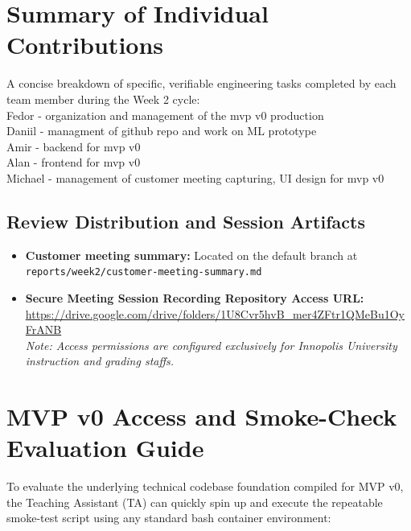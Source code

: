 \documentclass[11pt,a4paper]{article}
\begin{document}
\section{Summary of Individual Contributions}
A concise breakdown of specific, verifiable engineering tasks completed by each team member during the Week 2 cycle:\\
Fedor - organization and management of the mvp v0 production \\
Daniil - managment of github repo and work on ML prototype\\
Amir - backend for mvp v0 \\
Alan - frontend for mvp v0\\
Michael - management of customer meeting capturing, UI design for mvp v0\\
\subsection{Review Distribution and Session Artifacts}
\begin{itemize}[leftmargin=*]
    \item \textbf{Customer meeting summary:} Located on the default branch at \texttt{reports/week2/customer-meeting-summary.md}
    \item \textbf{Secure Meeting Session Recording Repository Access URL:} \\
    \small \url{https://drive.google.com/drive/folders/1U8Cvr5hvB_mer4ZFtr1QMeBu1OyFrANB} \\
    \textit{Note: Access permissions are configured exclusively for Innopolis University instruction and grading staffs.}
\end{itemize}

\section{MVP v0 Access and Smoke-Check Evaluation Guide}
To evaluate the underlying technical codebase foundation compiled for MVP v0, the Teaching Assistant (TA) can quickly spin up and execute the repeatable smoke-test script using any standard bash container environment:
\end{document}
